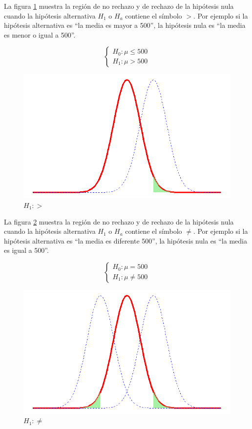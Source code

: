 \documentclass[letterpaper,]{book}
\begin{document}
La figura \ref{fig:phmore} muestra la región de no rechazo y de rechazo de la hipótesis nula cuando la hipótesis alternativa \(H_1\) o \(H_a\) contiene el símbolo \(>\). Por ejemplo si la hipótesis alternativa es ``la media es mayor a 500'', la hipótesis nula es ``la media es menor o igual a 500''.

\begin{equation} 
\begin{cases} 
H_0: \mu \leq 500 \\ 
H_1: \mu > 500
\end{cases} 
\end{equation}

\begin{figure}[!h]

{\centering \includegraphics[width=0.6\linewidth]{phmore} 

}

\caption{$H_1:>$}\label{fig:phmore}
\end{figure}

La figura \ref{fig:ph2c} muestra la región de no rechazo y de rechazo de la hipótesis nula cuando la hipótesis alternativa \(H_1\) o \(H_a\) contiene el símbolo \(\neq\). Por ejemplo si la hipótesis alternativa es ``la media es diferente 500'', la hipótesis nula es ``la media es igual a 500''.

\begin{equation} 
\begin{cases} 
H_0: \mu =  500 \\ 
H_1: \mu \neq 500
\end{cases} 
\end{equation}

\begin{figure}[!h]

{\centering \includegraphics[width=0.6\linewidth]{ph2c} 

}

\caption{$H_1:\neq$}\label{fig:ph2c}
\end{figure}
\end{document}
